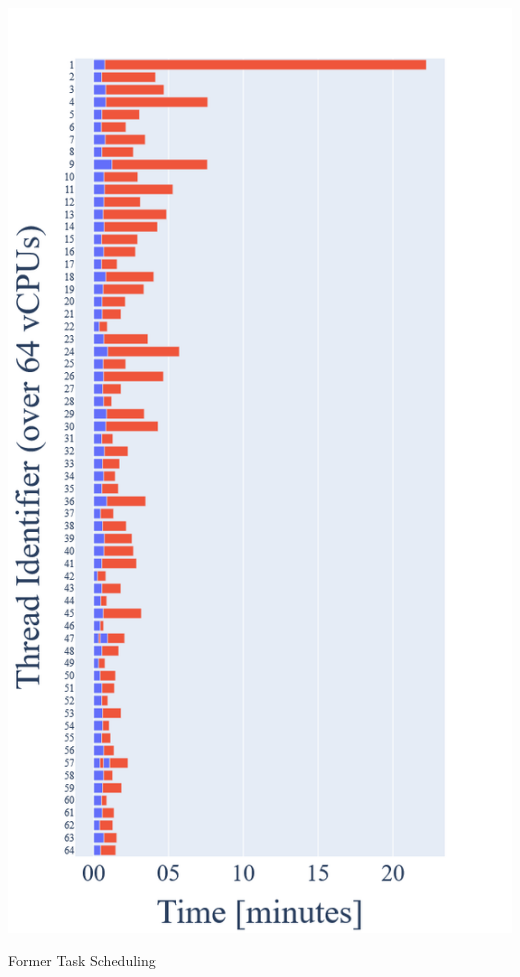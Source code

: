 \begin{marginfigure}[*-7.5]
  \centering
  \includegraphics[width=\textwidth]{figures/old}
  \caption{Former Task Scheduling}
\end{marginfigure}

